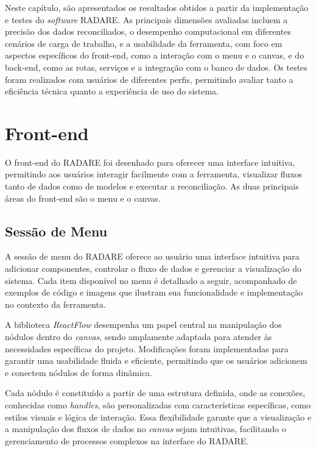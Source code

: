 \label{Cap:Resultados}

Neste capítulo, são apresentados os resultados obtidos a partir da implementação e testes do \textit{software} RADARE. As principais dimensões avaliadas incluem a precisão dos dados reconciliados, o desempenho computacional em diferentes cenários de carga de trabalho, e a usabilidade da ferramenta, com foco em aspectos específicos do front-end, como a interação com o menu e o canvas, e do back-end, como as rotas, serviços e a integração com o banco de dados. Os testes foram realizados com usuários de diferentes perfis, permitindo avaliar tanto a eficiência técnica quanto a experiência de uso do sistema.

\section{Front-end}

O front-end do RADARE foi desenhado para oferecer uma interface intuitiva, permitindo aos usuários interagir facilmente com a ferramenta, visualizar fluxos tanto de dados como de modelos e executar a reconciliação. As duas principais áreas do front-end são o menu e o canvas.

\subsection{Sessão de Menu}

A sessão de menu do RADARE oferece ao usuário uma interface intuitiva para adicionar componentes, controlar o fluxo de dados e gerenciar a visualização do sistema. Cada item disponível no menu é detalhado a seguir, acompanhado de exemplos de código e imagens que ilustram sua funcionalidade e implementação no contexto da ferramenta.

A biblioteca \textit{ReactFlow} \cite{reactflow} desempenha um papel central na manipulação dos nódulos dentro do \textit{canvas}, sendo amplamente adaptada para atender às necessidades específicas do projeto. Modificações foram implementadas para garantir uma usabilidade fluida e eficiente, permitindo que os usuários adicionem e conectem nódulos de forma dinâmica.

Cada nódulo é constituído a partir de uma estrutura definida, onde as conexões, conhecidas como \textit{handles}, são personalizadas com características específicas, como estilos visuais e lógica de interação. Essa flexibilidade garante que a visualização e a manipulação dos fluxos de dados no \textit{canvas} sejam intuitivas, facilitando o gerenciamento de processos complexos na interface do RADARE.

